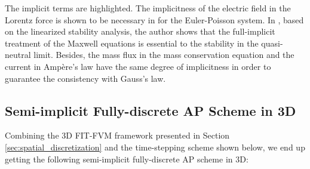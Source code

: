 \documentclass{article}
\begin{document}
The implicit terms are highlighted. The implicitness of the electric field in the Lorentz force is shown to be necessary in \cite{fabre_1992} for the Euler-Poisson system. In \cite{degond_2012}, based on the linearized stability analysis, the author shows that the full-implicit treatment of the Maxwell equations is essential to the stability in the quasi-neutral limit. Besides, the mass flux in the mass conservation equation and the current in Amp\`{e}re's law have the same degree of implicitness in order to guarantee the consistency with Gauss's law.  

\subsection{Semi-implicit Fully-discrete AP Scheme in 3D} \label{sec:3d_ap_scheme}
Combining the 3D FIT-FVM framework presented in Section \ref{sec:spatial_discretization} and the time-stepping scheme shown below, we end up getting the following semi-implicit fully-discrete AP scheme in 3D:
\end{document}
